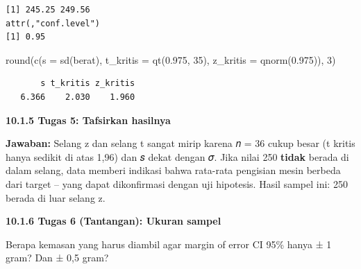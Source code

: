 \documentclass[
  indonesian,
  letterpaper,
]{book}
\newenvironment{Shaded}{\begin{snugshade}}{\end{snugshade}}
\newcommand{\AttributeTok}[1]{\textcolor[rgb]{0.40,0.45,0.13}{#1}}
\newcommand{\DecValTok}[1]{\textcolor[rgb]{0.68,0.00,0.00}{#1}}
\newcommand{\FloatTok}[1]{\textcolor[rgb]{0.68,0.00,0.00}{#1}}
\newcommand{\FunctionTok}[1]{\textcolor[rgb]{0.28,0.35,0.67}{#1}}
\newcommand{\NormalTok}[1]{\textcolor[rgb]{0.00,0.23,0.31}{#1}}
\newcommand{\SpecialCharTok}[1]{\textcolor[rgb]{0.37,0.37,0.37}{#1}}
\begin{document}
\begin{Shaded}
\end{Shaded}

\begin{verbatim}
[1] 245.25 249.56
attr(,"conf.level")
[1] 0.95
\end{verbatim}

\begin{Shaded}
\begin{Highlighting}[]
\FunctionTok{round}\NormalTok{(}\FunctionTok{c}\NormalTok{(}\AttributeTok{s =} \FunctionTok{sd}\NormalTok{(berat), }\AttributeTok{t\_kritis =} \FunctionTok{qt}\NormalTok{(}\FloatTok{0.975}\NormalTok{, }\DecValTok{35}\NormalTok{), }\AttributeTok{z\_kritis =} \FunctionTok{qnorm}\NormalTok{(}\FloatTok{0.975}\NormalTok{)), }\DecValTok{3}\NormalTok{)}
\end{Highlighting}
\end{Shaded}

\begin{verbatim}
       s t_kritis z_kritis 
   6.366    2.030    1.960 
\end{verbatim}

\textbf{10.1.5 Tugas 5: Tafsirkan hasilnya}

\textbf{Jawaban:} Selang z dan selang t sangat mirip karena 𝑛 = 36 cukup
besar (t kritis hanya sedikit di atas 1,96) dan 𝑠 dekat dengan 𝜎. Jika
nilai 250 \textbf{tidak} berada di dalam selang, data memberi indikasi
bahwa rata-rata pengisian mesin berbeda dari target -- yang dapat
dikonfirmasi dengan uji hipotesis. Hasil sampel ini: 250 berada di luar
selang z.

\textbf{10.1.6 Tugas 6 (Tantangan): Ukuran sampel}

Berapa kemasan yang harus diambil agar margin of error CI 95\% hanya ± 1
gram? Dan ± 0,5 gram?
\end{document}
